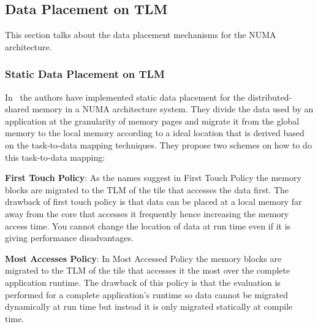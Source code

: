 \documentclass{listhesis}
\begin{document}
\subsection{Data Placement on TLM}
This section talks about the data placement mechanisms for the NUMA architecture.
\subsubsection{Static Data Placement on TLM}
In~\cite{lispaper} the authors have implemented static data placement for the distributed-shared memory in a NUMA architecture system. They divide the data used by an application at the granularity of memory pages and migrate it from the global memory to the local memory according to a ideal location that is derived based on the task-to-data mapping techniques. They propose two schemes on how to do this task-to-data mapping:\\
\par
\textbf{First Touch Policy}: As the names suggest in First Touch Policy the memory blocks are migrated to the TLM of the tile that accesses the data first. The drawback of first touch policy is that data can be placed at a local memory far away from the core that accesses it frequently hence increasing the memory access time. You cannot change the location of data at run time even if it is giving performance disadvantages.\\  
\par
\textbf{Most Accesses Policy}: In Most Accessed Policy the memory blocks are migrated to the TLM of the tile that accesses it the most over the complete application runtime. The drawback of this policy is that the evaluation is performed for a complete application's runtime so data cannot be migrated dynamically at run time but instead it is only migrated statically at compile time.
\end{document}

